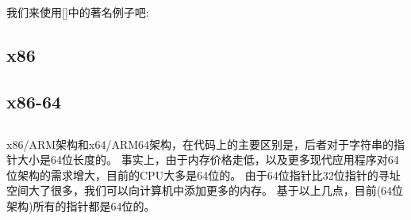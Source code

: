 \mysection{\HelloWorldSectionName}
\label{sec:helloworld}

我们来使用[\KRBook]中的著名例子吧:



\subsection{x86}




\subsection{x86-64}






\subsection{\Conclusion{}}

x86/ARM架构和x64/ARM64架构，在代码上的主要区别是，后者对于字符串的指针大小是64位长度的。
事实上，由于内存价格走低，以及更多现代应用程序对64位架构的需求增大，目前的\ac{CPU}大多是64位的。
由于64位指针比32位指针的寻址空间大了很多，我们可以向计算机中添加更多的内存。
基于以上几点，目前(64位架构)所有的指针都是64位的。




